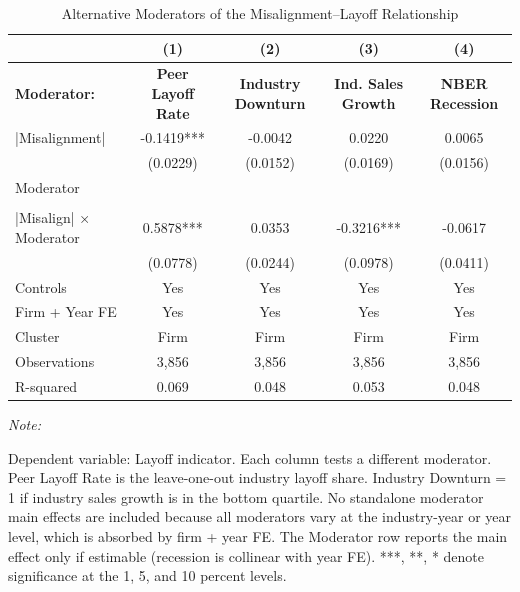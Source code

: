 \documentclass[
  10pt,
]{article}
\begin{document}
\newpage

\begin{table}[!h]
\centering
\caption{\label{tab:table8}Alternative Moderators of the Misalignment--Layoff Relationship}
\centering
\fontsize{8}{10}\selectfont
\begin{threeparttable}
\begin{tabular}[t]{lcccc}
\toprule
 & (1) & (2) & (3) & (4)\\
\midrule
\textbf{Moderator:} & \textbf{Peer Layoff Rate} & \textbf{Industry Downturn} & \textbf{Ind. Sales Growth} & \textbf{NBER Recession}\\
|Misalignment| & -0.1419*** & -0.0042 & 0.0220 & 0.0065\\
 & (0.0229) & (0.0152) & (0.0169) & (0.0156)\\
Moderator &  &  &  & \\
 &  &  &  & \\
\addlinespace
|Misalign| × Moderator & 0.5878*** & 0.0353 & -0.3216*** & -0.0617\\
\midrule
 & (0.0778) & (0.0244) & (0.0978) & (0.0411)\\
Controls & Yes & Yes & Yes & Yes\\
Firm + Year FE & Yes & Yes & Yes & Yes\\
Cluster & Firm & Firm & Firm & Firm\\
\addlinespace
Observations & 3,856 & 3,856 & 3,856 & 3,856\\
R-squared & 0.069 & 0.048 & 0.053 & 0.048\\
\bottomrule
\end{tabular}
\begin{tablenotes}[para]
\item \textit{Note: } 
\item Dependent variable: Layoff indicator. Each column tests a different moderator. Peer Layoff Rate is the leave-one-out industry layoff share. Industry Downturn = 1 if industry sales growth is in the bottom quartile. No standalone moderator main effects are included because all moderators vary at the industry-year or year level, which is absorbed by firm + year FE. The Moderator row reports the main effect only if estimable (recession is collinear with year FE). ***, **, * denote significance at the 1, 5, and 10 percent levels.
\end{tablenotes}
\end{threeparttable}
\end{table}
\end{document}
